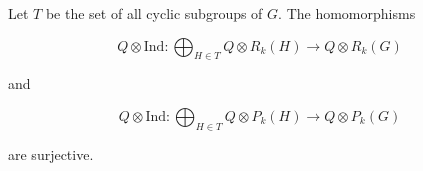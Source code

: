Let $T$ be the set of all cyclic subgroups of $G$. The homomorphisms

$$Q \otimes \text{Ind} : \bigoplus_{H \in T} Q \otimes R_k(H) \rightarrow Q \otimes R_k(G)$$

and

$$Q \otimes \text{Ind} : \bigoplus_{H \in T} Q \otimes P_k(H) \rightarrow Q \otimes P_k(G)$$

are surjective.
